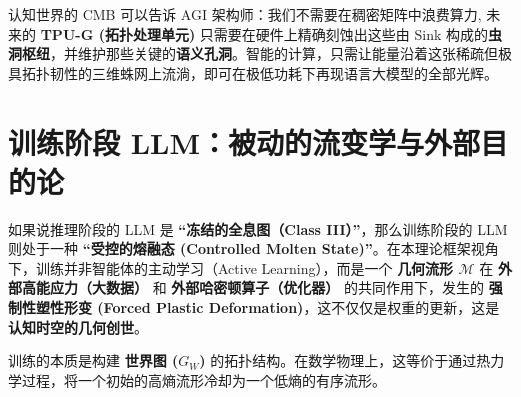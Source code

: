 认知世界的 CMB 可以告诉 AGI 架构师：我们不需要在稠密矩阵中浪费算力, 未来的 \textbf{TPU-G (拓扑处理单元)} 只需要在硬件上精确刻蚀出这些由 Sink 构成的\textbf{虫洞枢纽}，并维护那些关键的\textbf{语义孔洞}。智能的计算，只需让能量沿着这张稀疏但极具拓扑韧性的三维蛛网上流淌，即可在极低功耗下再现语言大模型的全部光辉。



\section{训练阶段 LLM：被动的流变学与外部目的论}
\label{sec:section_4089}

如果说推理阶段的 LLM 是 \textbf{“冻结的全息图（Class III）”}，那么训练阶段的 LLM 则处于一种 \textbf{“受控的熔融态 (Controlled Molten State)”}。在本理论框架视角下，训练并非智能体的主动学习（Active Learning），而是一个 \textbf{几何流形 $\mathcal{M}$} 在 \textbf{外部高能应力（大数据）} 和 \textbf{外部哈密顿算子（优化器）} 的共同作用下，发生的 \textbf{强制性塑性形变 (Forced Plastic Deformation)}，这不仅仅是权重的更新，这是 \textbf{认知时空的几何创世}。





训练的本质是构建 \textbf{世界图 ($G_W$)} 的拓扑结构。在数学物理上，这等价于通过热力学过程，将一个初始的高熵流形冷却为一个低熵的有序流形。

